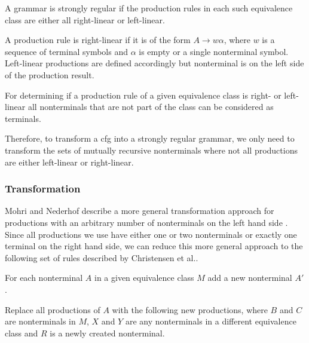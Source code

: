 A grammar is strongly regular if the production rules in each such equivalence class are either all right-linear or left-linear.

A production rule is right-linear if it is of the form $A \rightarrow w \alpha$, where $w$ is a sequence of terminal symbols and $\alpha$ is empty or a single nonterminal symbol. Left-linear productions are defined accordingly but nonterminal is on the left side of the production result.

For determining if a production rule of a given equivalence class is right- or left-linear all nonterminals that are not part of the class can be considered as terminals.

Therefore, to transform a \ac{cfg} into a strongly regular grammar, we only need to transform the sets of mutually recursive nonterminals where not all productions are either left-linear or right-linear.

\subsubsection{Transformation}

Mohri and Nederhof describe a more general transformation approach for productions with an arbitrary number of nonterminals on the left hand side \cite{mohri_nederhof}. Since all productions we use have either one or two nonterminals or exactly one terminal on the right hand side, we can reduce this more general approach to the following set of rules described by Christensen et al.\cite{brics}.

For each nonterminal $A$ in a given equivalence class $M$ add a new nonterminal $A'$.

Replace all productions of $A$ with the following new productions, where $B$ and $C$ are nonterminals in $M$, $X$ and $Y$ are any nonterminals in a different equivalence class and $R$ is a newly created nonterminal.

